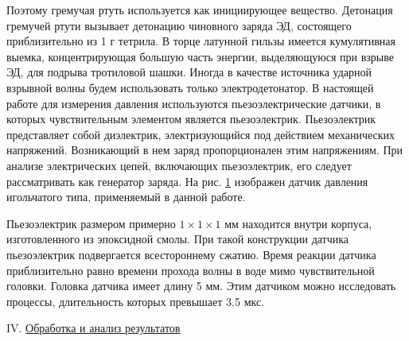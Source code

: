 \documentclass[specialist, subf, href, colorlinks=true, 14pt, final]{disser}
\theoremstyle{definition}
\newcommand{\npart}[2]{\noindent #1. \underline{#2}}
\begin{document}
Поэтому гремучая ртуть используется как инициирующее вещество. Детонация гремучей ртути вызывает детонацию чиновного заряда ЭД, состоящего приблизительно из 1 г тетрила. В торце латунной гильзы имеется кумулятивная выемка, концентрирующая большую часть энергии, выделяющуюся при взрыве ЭД, для подрыва тротиловой шашки. Иногда в качестве источника ударной взрывной волны будем использовать только электродетонатор. В настоящей работе для измерения давления используются пьезоэлектрические датчики, в которых чувствительным элементом является пьезоэлектрик. Пьезоэлектрик представляет собой диэлектрик, электризующийся под действием механических напряжений. Возникающий в нем заряд пропорционален этим напряжениям. При анализе электрических цепей, включающих пьезоэлектрик, его следует рассматривать как генератор заряда. На рис. \ref{2-7-4} изображен датчик давления игольчатого типа, применяемый в данной работе.

Пьезоэлектрик размером примерно $1\times 1\times 1$ мм находится внутри корпуса, изготовленного из эпоксидной смолы. При такой конструкции датчика пьезоэлектрик подвергается всестороннему сжатию. Время реакции датчика приблизительно равно времени прохода волны в воде мимо чувствительной головки. Головка датчика имеет длину 5 мм. Этим датчиком можно исследовать процессы, длительность которых превышает 3.5 мкс.
\begin{figure}[!htp]
  \caption{}
  \label{2-7-4}
\end{figure}

\npart{IV}{Обработка и анализ результатов}
\end{document}
